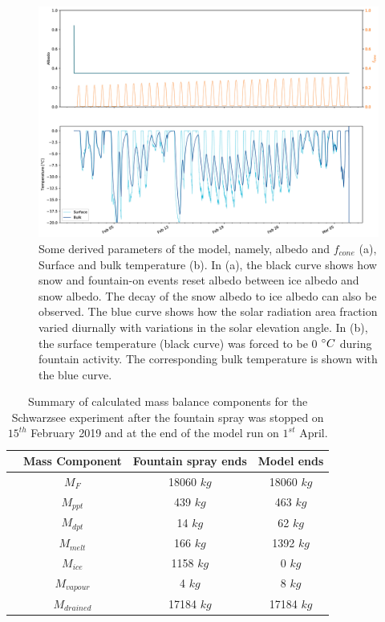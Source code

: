 \documentclass[utf8]{frontiersSCNS} %
\begin{document}
\begin{figure} \begin{center} \includegraphics[width=15 cm]{Figures/Figure_7.jpg} \end{center} \caption{Some derived
  parameters of the model, namely, albedo and $f_{cone}$ (a), Surface and bulk temperature (b). In (a), the black curve
  shows how snow and fountain-on events reset albedo between ice albedo and snow albedo.  The decay of the snow albedo
  to ice albedo can also be observed. The blue curve shows how the solar radiation area fraction varied diurnally with
  variations in the solar elevation angle. In (b), the surface temperature (black curve) was forced to be 0 $\degree C$
  during fountain activity. The corresponding bulk temperature is shown with the blue curve.} \label{fig:derived}
  \end{figure}
  

\begin{table} \caption{Summary of calculated mass balance components for the Schwarzsee experiment after the fountain
    spray was stopped on $15^{th}$ February 2019 and at the end of the model run on $1^{st}$ April.} \centering
    \begin{tabular}{|c|c|c|c|} \hline & \multicolumn{1}{c|}{Mass Component} & \multicolumn{1}{c|}{Fountain spray ends}
    & \multicolumn{1}{c|}{Model ends} \\ \hline & $M_F$ & 18060 $kg$ & 18060 $kg$\\
    \parbox{2mm}{} & $M_{ppt}$ & 439 $kg$ & 463 $kg$\\ & $M_{dpt}$ & 14 $kg$ & 62
    $kg$ \\ \hline & $M_{melt}$ & 166 $kg$ & 1392 $kg$\\ \parbox{2mm}{} & $M_{ice}$ &
    1158 $kg$ & 0 $kg$\\ & $M_{vapour}$ & 4 $kg$ & 8 $kg$\\ & $M_{drained}$ & 17184 $kg$ & 17184 $kg$\\
 
 \hline \end{tabular} \label{table:MB} \end{table}
\end{document}
